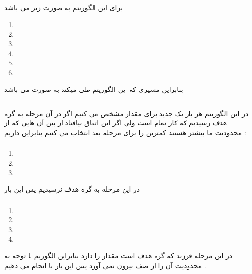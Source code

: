 \documentclass{article}
\begin{document}
\subsection*{\textcolor{red}{}}
برای این الگوریتم 
به صورت زیر می باشد : 
\begin{center}
	\begin{enumerate}
	 \item {}
	 \item {}
	 \item {}
	 \item {}
	 \item {}
	 \item {}
	\end{enumerate}
\end{center}
بنابراین مسیری که این الگوریتم طی میکند به صورت 
می باشد 
\subsection*{\textcolor{red}{}}
در این الگوریتم هر بار یک 
جدید برای مقدار 
مشخص می کنیم اگر در آن مرحله به گره هدف رسیدیم که کار تمام است ولی اگر این اتفاق نیافتاد از بین آن هایی که از محدودیت ما بیشتر هستند کمترین را برای 
مرحله بعد انتخاب می کنیم بنابراین داریم  : 
\subsubsection*{}
\begin{center}
	\begin{enumerate}
		\item {}
		\item {}
		\item {}
	\end{enumerate}
\end{center}
در این مرحله به گره هدف نرسیدیم پس این بار 
\subsubsection*{}
\begin{center}
	\begin{enumerate}
		\item {}
		\item {}
		\item {}
		\item {}
	\end{enumerate}
\end{center}
در این مرحله فرزند 
که گره هدف است مقدار 
را دارد بنابراین الگوریم با توجه به محدودیت آن را از صف بیرون نمی آورد پس این بار با 
انجام می دهیم  .
\end{document}
